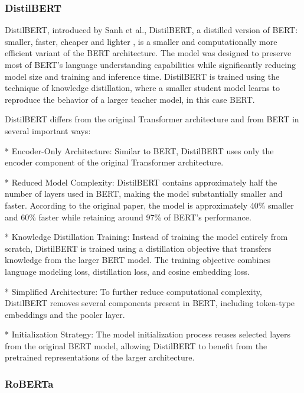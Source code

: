 \subsubsection{DistilBERT}

\begin{markdown}

DistilBERT, introduced by Sanh et al., DistilBERT, a distilled version of BERT: smaller, faster, cheaper and lighter \cite{sanh_distilbert_2020}, is a smaller and computationally more efficient variant of the BERT architecture. The model was designed to preserve most of BERT’s language understanding capabilities while significantly reducing model size and training and inference time. DistilBERT is trained using the technique of knowledge distillation, where a smaller student model learns to reproduce the behavior of a larger teacher model, in this case BERT.

DistilBERT differs from the original Transformer architecture and from BERT in several important ways:

* Encoder-Only Architecture: Similar to BERT, DistilBERT uses only the encoder component of the original Transformer architecture.

* Reduced Model Complexity: DistilBERT contains approximately half the number of layers used in BERT, making the model substantially smaller and faster. According to the original paper, the model is approximately 40\% smaller and 60\% faster while retaining around 97\% of BERT’s performance.

* Knowledge Distillation Training: Instead of training the model entirely from scratch, DistilBERT is trained using a distillation objective that transfers knowledge from the larger BERT model. The training objective combines language modeling loss, distillation loss, and cosine embedding loss.

* Simplified Architecture: To further reduce computational complexity, DistilBERT removes several components present in BERT, including token-type embeddings and the pooler layer.

* Initialization Strategy: The model initialization process reuses selected layers from the original BERT model, allowing DistilBERT to benefit from the pretrained representations of the larger architecture.

\end{markdown}

\subsubsection{RoBERTa}

